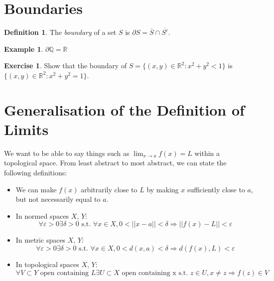 \documentclass{article}
\theoremstyle{definition}
\newtheorem{definition}{Definition}
\newtheorem{exampled}{Example}[definition]
\newtheorem*{exercise}{Exercise}
\newcommand{\st}{\text{ s.t. }}
\begin{document}
\section{Boundaries}
\begin{definition}
	The \emph{boundary} of a set $S$ is $\partial S = \overline{S} \cap \overline{S^c}$.
\end{definition}
\begin{exampled}
	$\partial \mathbb{Q}=\mathbb{R}$
\end{exampled}

\begin{exercise}
	Show that the boundary of $S=\{(x,y)\in\mathbb{R}^2 : x^2+y^2<1\}$ is $\{(x, y)\in\mathbb{R}^2 : x^2 + y^2 = 1\}$.
\end{exercise}

\section{Generalisation of the Definition of Limits}
We want to be able to say things such as $\lim_{x\rightarrow a} f(x)=L$ within a topological space. From least abstract to most abstract, we can state the following definitions:
\begin{itemize}
	\item We can make $f(x)$ arbitrarily close to $L$ by making $x$ sufficiently close to $a$, but not necessarily equal to $a$.
	\item In normed spaces $X$, $Y$:
		$$\forall \varepsilon > 0 \exists \delta > 0 \st \forall x \in X, 0<||x-a||<\delta \Rightarrow ||f(x)-L||<\varepsilon$$
	\item In metric spaces $X$, $Y$:
		$$\forall \varepsilon > 0 \exists \delta > 0 \st \forall x \in X, 0<d(x, a)<\delta \Rightarrow d(f(x), L)<\varepsilon$$
	\item In topological spaces $X$, $Y$:
		$$\forall V \subset Y \text{ open containing $L$} \exists U \subset X \text{ open containing x} \st z\in U, x \neq z \Rightarrow f(z) \in V$$
\end{itemize}
\end{document}
